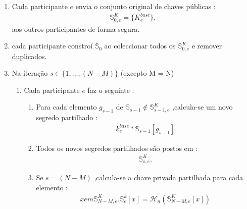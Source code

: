 \begin{enumerate}
    \item Cada participante $e$ envia o conjunto original de chaves públicas :
\begin{align*}
\mathbb{S}^K_{0,e} = \{K^{base}_e\} ,
\end{align*}
aos outros participantes de forma segura.

    \item cada participante constroí $\mathbb{S}_{0}$ ao coleccionar todos os $\mathbb{S}^K_{0,e}$ e remover duplicados.
    \item Na iteração $s \in \{1,...,(N-M)\}$ (excepto M = N)
    \begin{enumerate}
        \item Cada participante $e$ faz o seguinte :
        \begin{enumerate}
            \item Para cada elemento $g_{s-1}$ de \newline $\mathbb{S}_{s-1} \notin \mathbb{S}^K_{s-1,e}$ ,\newline calcula-se um novo segredo partilhado :
\begin{align*}
k^{base}_e*\mathbb{S}_{s-1}[g_{s-1}]
\end{align*}
            \item Todos os novos segredos partilhados são postos em : 
\begin{align*}
\mathbb{S}^K_{s,e} .
\end{align*}
            \item Se $s = (N-M)$ ,\newline calcula-se a chave privada partilhada para cada elemento :
\begin{align*}
x em \mathbb{S}^K_{N-M,e} .
\mathbb{S}^{k}_{e}[x] = \mathcal{H}_n(\mathbb{S}^K_{N-M,e}[x])
\end{align*}

\end{enumerate}
\end{enumerate}
\end{enumerate}
